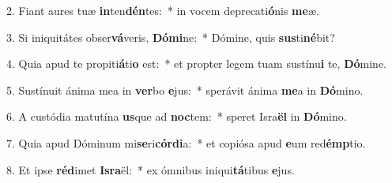 2. Fiant aures tuæ \textbf{in}ten\textbf{dén}tes:~*  in vocem deprecati\textbf{ó}nis \textbf{me}æ.\

3. Si iniquitátes obser\textbf{vá}veris, \textbf{Dó}\textbf{mi}ne:~*  Dómine, quis \textbf{sus}ti\textbf{né}bit?\

4. Quia apud te propiti\textbf{á}ti\textbf{o} est:~*  et propter legem tuam sustínu\textbf{i} te, \textbf{Dó}mine.\

5. Sustínuit ánima mea in \textbf{ver}bo \textbf{e}jus:~*  sperávit ánima \textbf{me}a in \textbf{Dó}mino.\

6. A custódia matutína \textbf{us}que ad \textbf{noc}tem:~*  speret Isra\textbf{ël} in \textbf{Dó}mino.\

7. Quia apud Dóminum mi\textbf{se}ri\textbf{cór}\textbf{di}a:~*  et copiósa apud \textbf{e}um red\textbf{émp}tio.\

8. Et ipse \textbf{réd}imet \textbf{Is}\textbf{ra}ël:~*  ex ómnibus iniqui\textbf{tá}tibus \textbf{e}jus.\

